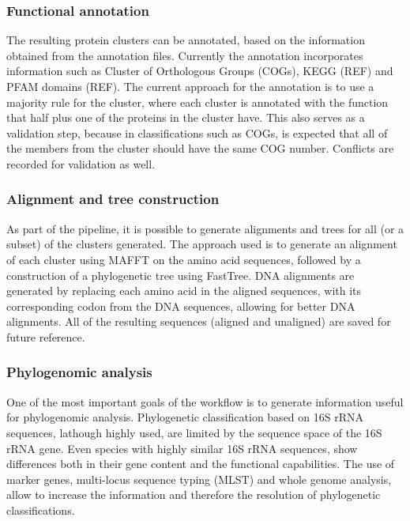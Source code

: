 \subsubsection{Functional annotation}

The resulting protein clusters can be annotated, based on the information obtained from the annotation files. Currently the annotation incorporates information such as Cluster of Orthologous Groups (COGs), KEGG (REF) and PFAM domains (REF). The current approach for the annotation is to use a majority rule for the cluster, where each cluster is annotated with the function that half plus one of the proteins in the cluster have. This also serves as a validation step, because in classifications such as COGs, is expected that all of the members from the cluster should have the same COG number. Conflicts are recorded for validation as well.

\subsubsection{Alignment and tree construction}

As part of the pipeline, it is possible to generate alignments and trees for all (or a subset) of the clusters generated. The approach used is to generate an alignment of each cluster using MAFFT on the amino acid sequences, followed by a construction of a phylogenetic tree using FastTree. DNA alignments are generated by replacing each amino acid in the aligned sequences, with its corresponding codon from the DNA sequences, allowing for better DNA alignments. All of the resulting sequences (aligned and unaligned) are saved for future reference.

\subsubsection{Phylogenomic analysis}

One of the most important goals of the workflow is to generate information useful for phylogenomic analysis. Phylogenetic classification based on 16S rRNA sequences, lathough highly used, are limited by the sequence space of the 16S rRNA gene. Even species with highly similar 16S rRNA sequences, show differences both in their gene content and the functional capabilities. The use of marker genes, multi-locus sequence typing (MLST) and whole genome analysis, allow to increase the information and therefore the resolution of phylogenetic classifications. 

